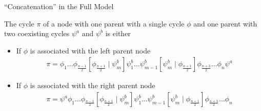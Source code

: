 \begin{frame}{``Concatenation'' in the Full Model}
	\vspace{-1em}
	\begin{theorem}
		The cycle $\pi$ of a node with one parent with a single cycle $\phi$ and one parent with two coexisting cycles $\psi^a$ and $\psi^b$ is either
		\begin{itemize}
			\item If $\phi$ is associated with the left parent node
			      \begin{align*}
				      \pi = \phi_1 \dots \phi_{\frac{n-1}{2}} \left[\phi_{\frac{n+1}{2}} \mid \psi^b_m\right] \psi^b_1 \dots \psi^b_{m-1} \left[\psi^b_m \mid \phi_{\frac{n+1}{2}}\right] \phi_{\frac{n+3}{2}} \dots \phi_n \psi^a
			      \end{align*}
			\item If $\phi$ is associated with the right parent node
			      \begin{align*}
				      \pi = \psi^a \phi_1 \dots \phi_{\frac{n-1}{2}} \left[\phi_{\frac{n+1}{2}} \mid \psi^b_m\right] \psi^b_1 \dots \psi^b_{m-1} \left[\psi^b_m \mid \phi_{\frac{n+1}{2}}\right] \phi_{\frac{n+3}{2}} \dots \phi_n
			      \end{align*}
		\end{itemize}
	\end{theorem}
\end{frame}


